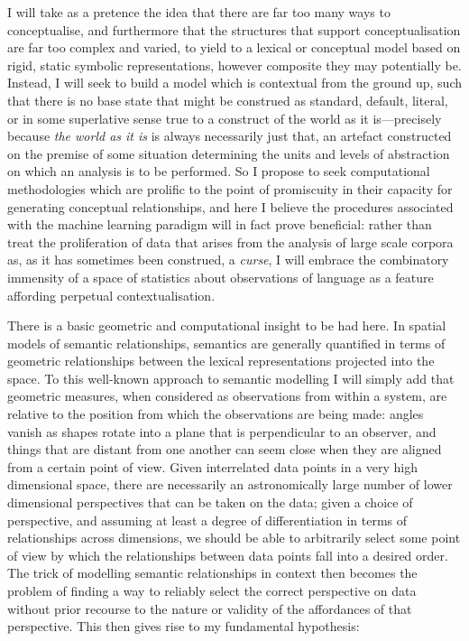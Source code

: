 I will take as a pretence the idea that there are far too many ways to conceptualise, and furthermore that the structures that support conceptualisation are far too complex and varied, to yield to a lexical or conceptual model based on rigid, static symbolic representations, however composite they may potentially be.  Instead, I will seek to build a model which is contextual from the ground up, such that there is no base state that might be construed as standard, default, literal, or in some superlative sense true to a construct of the world as it is---precisely because \emph{the world as it is} is always necessarily just that, an artefact constructed on the premise of some situation determining the units and levels of abstraction on which an analysis is to be performed.  So I propose to seek computational methodologies which are prolific to the point of promiscuity in their capacity for generating conceptual relationships, and here I believe the procedures associated with the machine learning paradigm will in fact prove beneficial: rather than treat the proliferation of data that arises from the analysis of large scale corpora as, as it has sometimes been construed, a \emph{curse}, I will embrace the combinatory immensity of a space of statistics about observations of language as a feature affording perpetual contextualisation.

There is a basic geometric and computational insight to be had here.  In spatial models of semantic relationships, semantics are generally quantified in terms of geometric relationships between the lexical representations projected into the space.  To this well-known approach to semantic modelling I will simply add that geometric measures, when considered as observations from within a system, are relative to the position from which the observations are being made: angles vanish as shapes rotate into a plane that is perpendicular to an observer, and things that are distant from one another can seem close when they are aligned from a certain point of view.  Given interrelated data points in a very high dimensional space, there are necessarily an astronomically large number of lower dimensional perspectives that can be taken on the data; given a choice of perspective, and assuming at least a degree of differentiation in terms of relationships across dimensions, we should be able to arbitrarily select some point of view by which the relationships between data points fall into a desired order.  The trick of modelling semantic relationships in context then becomes the problem of finding a way to reliably select the correct perspective on data without prior recourse to the nature or validity of the affordances of that perspective.  This then gives rise to my fundamental hypothesis:

